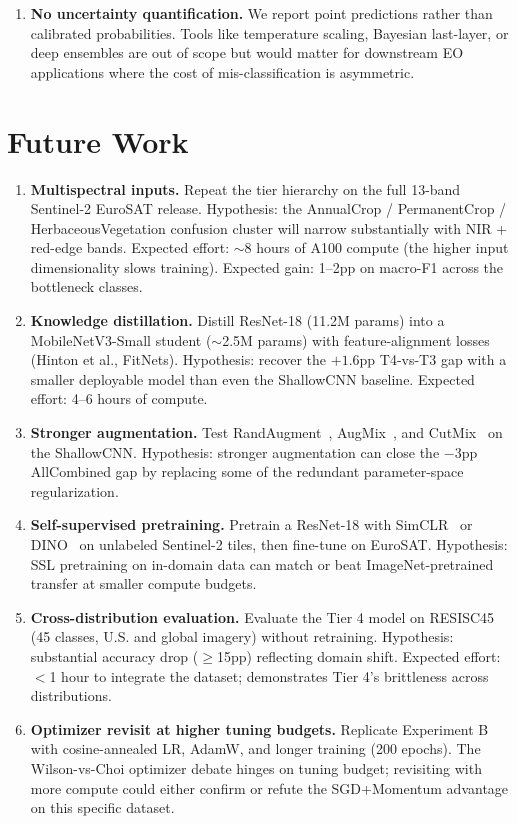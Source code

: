 \documentclass[10pt,letterpaper]{article}
\begin{document}
\begin{enumerate}[leftmargin=2em]
    \item \textbf{No uncertainty quantification.} We report point predictions rather than calibrated probabilities. Tools like temperature scaling, Bayesian last-layer, or deep ensembles are out of scope but would matter for downstream EO applications where the cost of mis-classification is asymmetric.
\end{enumerate}

\section{Future Work}
\label{sec:future}
\begin{enumerate}[leftmargin=2em]
    \item \textbf{Multispectral inputs.} Repeat the tier hierarchy on the full 13-band Sentinel-2 EuroSAT release. Hypothesis: the AnnualCrop / PermanentCrop / HerbaceousVegetation confusion cluster will narrow substantially with NIR + red-edge bands. Expected effort: $\sim$8 hours of A100 compute (the higher input dimensionality slows training). Expected gain: 1--2pp on macro-F1 across the bottleneck classes.
    \item \textbf{Knowledge distillation.} Distill ResNet-18 (11.2M params) into a MobileNetV3-Small student ($\sim$2.5M params) with feature-alignment losses (Hinton et al., FitNets). Hypothesis: recover the $+1.6$pp T4-vs-T3 gap with a smaller deployable model than even the ShallowCNN baseline. Expected effort: 4--6 hours of compute.
    \item \textbf{Stronger augmentation.} Test RandAugment~\cite{randaugment2020}, AugMix~\cite{augmix2020}, and CutMix~\cite{cutmix2019} on the ShallowCNN. Hypothesis: stronger augmentation can close the $-3$pp AllCombined gap by replacing some of the redundant parameter-space regularization.
    \item \textbf{Self-supervised pretraining.} Pretrain a ResNet-18 with SimCLR~\cite{simclr2020} or DINO~\cite{dino2021} on unlabeled Sentinel-2 tiles, then fine-tune on EuroSAT. Hypothesis: SSL pretraining on in-domain data can match or beat ImageNet-pretrained transfer at smaller compute budgets.
    \item \textbf{Cross-distribution evaluation.} Evaluate the Tier 4 model on RESISC45 (45 classes, U.S. and global imagery) without retraining. Hypothesis: substantial accuracy drop ($\geq$15pp) reflecting domain shift. Expected effort: $<$1 hour to integrate the dataset; demonstrates Tier 4's brittleness across distributions.
    \item \textbf{Optimizer revisit at higher tuning budgets.} Replicate Experiment B with cosine-annealed LR, AdamW, and longer training (200 epochs). The Wilson-vs-Choi optimizer debate hinges on tuning budget; revisiting with more compute could either confirm or refute the SGD+Momentum advantage on this specific dataset.

\end{enumerate}
\end{document}
